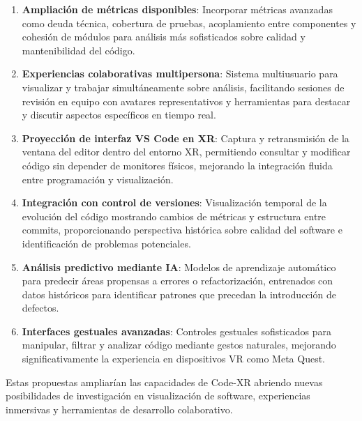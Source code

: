 \documentclass[a4paper, 12pt]{book}
\begin{document}
\begin{enumerate}
  \item \textbf{Ampliación de métricas disponibles}: Incorporar métricas avanzadas como deuda técnica, cobertura de pruebas, acoplamiento entre componentes y cohesión de módulos para análisis más sofisticados sobre calidad y mantenibilidad del código.
  
  \item \textbf{Experiencias colaborativas multipersona}: Sistema multiusuario para visualizar y trabajar simultáneamente sobre análisis, facilitando sesiones de revisión en equipo con avatares representativos y herramientas para destacar y discutir aspectos específicos en tiempo real.

  \item \textbf{Proyección de interfaz VS Code en XR}: Captura y retransmisión de la ventana del editor dentro del entorno XR, permitiendo consultar y modificar código sin depender de monitores físicos, mejorando la integración fluida entre programación y visualización.

  \item \textbf{Integración con control de versiones}: Visualización temporal de la evolución del código mostrando cambios de métricas y estructura entre commits, proporcionando perspectiva histórica sobre calidad del software e identificación de problemas potenciales.
  
  \item \textbf{Análisis predictivo mediante IA}: Modelos de aprendizaje automático para predecir áreas propensas a errores o refactorización, entrenados con datos históricos para identificar patrones que precedan la introducción de defectos.
    
  \item \textbf{Interfaces gestuales avanzadas}: Controles gestuales sofisticados para manipular, filtrar y analizar código mediante gestos naturales, mejorando significativamente la experiencia en dispositivos VR como Meta Quest.
  \end{enumerate}

Estas propuestas ampliarían las capacidades de Code-XR abriendo nuevas posibilidades de investigación en visualización de software, experiencias inmersivas y herramientas de desarrollo colaborativo.


\end{document}
